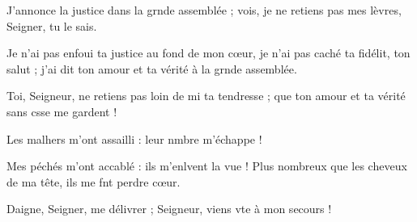 \item J’annonce la justice dans la grnde assemblée ;\psstar{} vois, je ne retiens pas mes lèvres, Seigner, tu le sais.
\item Je n’ai pas enfoui ta justice au fond de mon cœur,\pscross{} je n’ai pas caché ta fidélit, ton salut ;\psstar{} j’ai dit ton amour et ta vérité à la grnde assemblée.
\item Toi, Seigneur, ne retiens pas loin de mi ta tendresse ;\psstar{} que ton amour et ta vérité sans csse me gardent !
\item Les malhers m’ont assailli :\psstar{} leur nmbre m’échappe ! 
\item Mes péchés m’ont accablé : ils m’enlvent la vue !\psstar{} Plus nombreux que les cheveux de ma tête, ils me fnt perdre cœur.
\item Daigne, Seigner, me délivrer ;\psstar{} Seigneur, viens vte à mon secours !